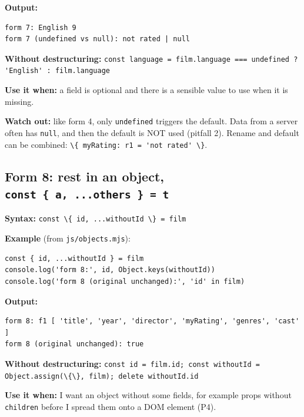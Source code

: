 \documentclass[
]{article}
\newcommand{\passthrough}[1]{#1}
\begin{document}
\textbf{Output:}

\begin{lstlisting}
form 7: English 9
form 7 (undefined vs null): not rated | null
\end{lstlisting}

\textbf{Without destructuring:}
\passthrough{\lstinline!const language = film.language === undefined ? 'English' : film.language!}

\textbf{Use it when:} a field is optional and there is a sensible value
to use when it is missing.

\textbf{Watch out:} like form 4, only
\passthrough{\lstinline!undefined!} triggers the default. Data from a
server often has \passthrough{\lstinline!null!}, and then the default is
NOT used (pitfall 2). Rename and default can be combined:
\passthrough{\lstinline!\{ myRating: r1 = 'not rated' \}!}.

\hypertarget{form-8-rest-in-an-object-const-a-...others-t}{%
\subsection{\texorpdfstring{Form 8: rest in an object,
\texttt{const\ \{\ a,\ ...others\ \}\ =\ t}}{Form 8: rest in an object, const \{ a, ...others \} = t}}\label{form-8-rest-in-an-object-const-a-...others-t}}

\textbf{Syntax:}
\passthrough{\lstinline!const \{ id, ...withoutId \} = film!}

\textbf{Example} (from \passthrough{\lstinline!js/objects.mjs!}):

\begin{lstlisting}
const { id, ...withoutId } = film
console.log('form 8:', id, Object.keys(withoutId))
console.log('form 8 (original unchanged):', 'id' in film)
\end{lstlisting}

\textbf{Output:}

\begin{lstlisting}
form 8: f1 [ 'title', 'year', 'director', 'myRating', 'genres', 'cast' ]
form 8 (original unchanged): true
\end{lstlisting}

\textbf{Without destructuring:}
\passthrough{\lstinline!const id = film.id; const withoutId = Object.assign(\{\}, film); delete withoutId.id!}

\textbf{Use it when:} I want an object without some fields, for example
props without \passthrough{\lstinline!children!} before I spread them
onto a DOM element (P4).
\end{document}
